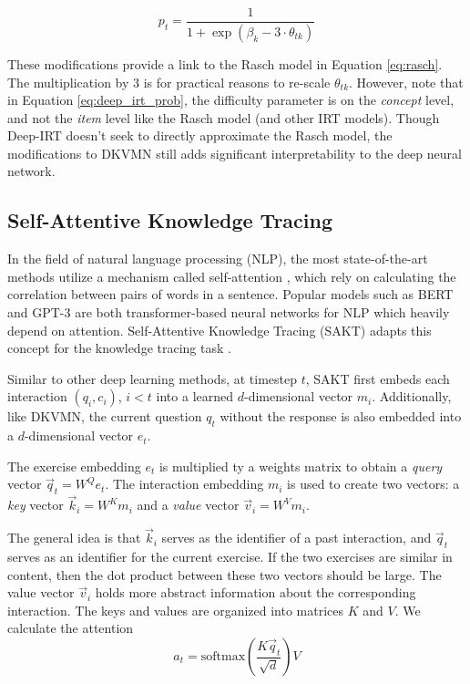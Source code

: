 \begin{equation}
  p_t = \frac{1}{1 + \exp\left( \beta_k - 3\cdot \theta_{tk} \right)}
  \label{eq:deep_irt_prob}
\end{equation}

These modifications provide a link to the Rasch model in Equation \ref{eq:rasch}. The multiplication by 3 is for practical reasons to re-scale $\theta_{tk}$. However, note that in Equation \ref{eq:deep_irt_prob}, the difficulty parameter is on the \textit{concept} level, and not the \textit{item} level like the Rasch model (and other IRT models). Though Deep-IRT doesn't seek to directly approximate the Rasch model, the modifications to DKVMN still adds significant interpretability to the deep neural network.


\subsection{Self-Attentive Knowledge Tracing}
In the field of natural language processing (NLP), the most state-of-the-art methods utilize a mechanism called self-attention \cite{vaswani2017}, which rely on calculating the correlation between pairs of words in a sentence. Popular models such as BERT \cite{bert} and GPT-3 \cite{gpt3} are both transformer-based neural networks for NLP which heavily depend on attention. Self-Attentive Knowledge Tracing (SAKT) adapts this concept for the knowledge tracing task \cite{pandey2019}. 

Similar to other deep learning methods, at timestep $t$, SAKT first embeds each interaction $(q_i, c_i)$, $i<t$ into a learned $d$-dimensional vector $m_i$. Additionally, like DKVMN, the current question $q_t$ without the response is also embedded into a $d$-dimensional vector $e_t$. 

The exercise embedding $e_t$ is multiplied ty a weights matrix to obtain a \textit{query} vector $\vec q_t = W^{Q}e_t$. The interaction embedding $m_i$ is used to create two vectors: a \textit{key} vector $\vec k_i = W^{K}m_i$ and a \textit{value} vector $\vec v_i = W^V m_i$. 

The general idea is that $\vec k_i$ serves as the identifier of a past interaction, and $\vec q_t$ serves as an identifier for the current exercise. If the two exercises are similar in content, then the dot product between these two vectors should be large. The value vector $\vec v_i$ holds more abstract information about the corresponding interaction. The keys and values are organized into matrices $K$ and $V$. We calculate the attention
\begin{equation}
  a_{t} = \text{softmax}\left(\frac{K \vec q_t}{\sqrt{d}} \right) V
  \label{eq:attn}
\end{equation}

